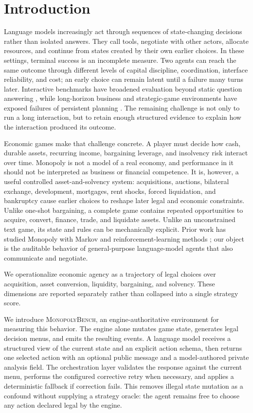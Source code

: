 \documentclass[conference]{IEEEtran}
\newcommand{\Bench}{\textsc{MonopolyBench}}
\begin{document}
\section{Introduction}
\label{sec:introduction}

Language models increasingly act through sequences of state-changing
decisions rather than isolated answers. They call tools, negotiate with other
actors, allocate resources, and continue from states created by their own
earlier choices. In these settings, terminal success is an incomplete measure.
Two agents can reach the same outcome through different levels
of capital discipline, coordination, interface reliability, and cost; an
early choice can remain latent until a failure many turns later. Interactive
benchmarks have broadened evaluation beyond static question answering
\cite{agentbench,taubench}, while long-horizon business and strategic-game
environments have exposed failures of persistent planning
\cite{vendingbench,dsgbench,cattletrade}. The remaining challenge is not only
to run a long interaction, but to retain enough structured evidence to
explain how the interaction produced its outcome.

Economic games make that challenge concrete. A player must decide how cash,
durable assets, recurring income, bargaining leverage, and insolvency risk
interact over time. Monopoly is not a model of a real economy, and performance
in it should not be interpreted as business or financial competence. It is,
however, a useful controlled asset-and-solvency system: acquisitions,
auctions, bilateral exchange, development, mortgages, rent shocks, forced
liquidation, and bankruptcy cause earlier choices to reshape later legal and
economic constraints. Unlike one-shot bargaining, a complete game contains
repeated opportunities to acquire, convert, finance, trade, and liquidate
assets. Unlike an unconstrained text game, its state and rules can be
mechanically explicit. Prior work has studied Monopoly with Markov and
reinforcement-learning methods \cite{monopoly_markov,monopoly_rl,monopoly_drl};
our object is the auditable behavior of general-purpose language-model agents
that also communicate and negotiate.

We operationalize economic agency as a trajectory of legal choices over
acquisition, asset conversion, liquidity, bargaining, and solvency. These
dimensions are reported separately rather than collapsed into a single
strategy score.

We introduce \Bench, an engine-authoritative environment for measuring this
behavior. The engine alone mutates game state, generates legal decision menus,
and emits the resulting events. A language model receives a structured view
of the current state and an explicit action schema, then returns one selected
action with an optional public message and a model-authored private analysis
field.
The orchestration layer validates the response against the current menu,
performs the configured corrective retry when necessary, and applies a
deterministic fallback if correction fails. This removes illegal state
mutation as a confound without supplying a strategy oracle: the agent remains
free to choose any action declared legal by the engine.
\end{document}
